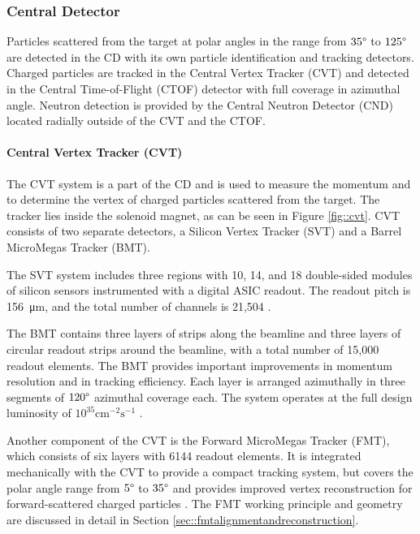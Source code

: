 \subsubsection{Central Detector} \label{sssec::centraldetector}
    Particles scattered from the target at polar angles in the range from $35\degree$ to $125\degree$ are detected in the CD with its own particle identification and tracking detectors.
    Charged particles are tracked in the Central Vertex Tracker (CVT) and detected in the Central Time-of-Flight (CTOF) detector with full coverage in azimuthal angle.
    Neutron detection is provided by the Central Neutron Detector (CND) located radially outside of the CVT and the CTOF.

\paragraph{Central Vertex Tracker (CVT)}
    The CVT system is a part of the CD and is used to measure the momentum and to determine the vertex of charged particles scattered from the target.
    The tracker lies inside the solenoid magnet, as can be seen in Figure \ref{fig::cvt}.
    CVT consists of two separate detectors, a Silicon Vertex Tracker (SVT) and a
    Barrel MicroMegas Tracker (BMT).

    The SVT system includes three regions with 10, 14, and 18 double-sided modules of silicon sensors instrumented with a digital ASIC readout.
    The readout pitch is \SI{156}{\micro\metre}, and the total number of channels is 21,504 \cite{antonioli2020}.

    The BMT contains three layers of strips along the beamline and three layers of circular readout strips around the beamline, with a total number of 15,000 readout elements.
    The BMT provides important improvements in momentum resolution and in tracking efficiency.
    Each layer is arranged azimuthally in three segments of $120\degree$ azimuthal coverage each.
    The system operates at the full design luminosity of $10^{35} \text{cm}^{-2}\text{s}^{-1}$ \cite{acker2020mvt}.

    Another component of the CVT is the Forward MicroMegas Tracker (FMT), which consists of six layers with 6144 readout elements.
    It is integrated mechanically with the CVT to provide a compact tracking system, but covers the polar angle range from $5\degree$ to $35\degree$ and provides improved vertex reconstruction for forward-scattered charged particles \cite{acker2020mvt}.
    The FMT working principle and geometry are discussed in detail in Section \ref{sec::fmtalignmentandreconstruction}.

